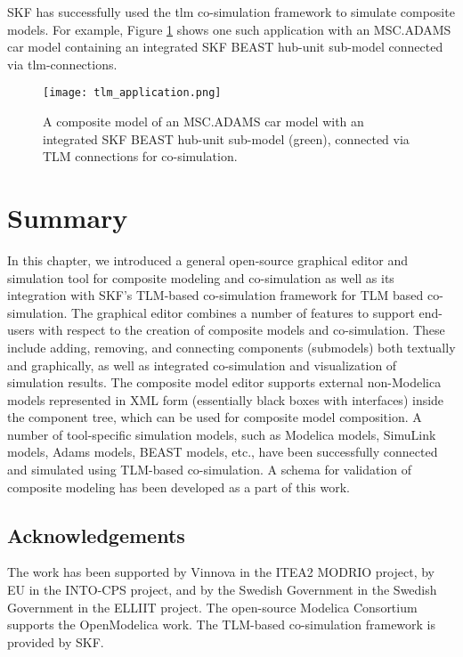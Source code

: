 SKF has successfully used the \acrshort{tlm} co-simulation framework to simulate composite models. For
example, Figure \ref{fig:tlmapplication} shows one such application with an MSC.ADAMS \cite{adams} car model
containing an integrated SKF BEAST\cite{beast} hub-unit sub-model 
connected via \acrshort{tlm}-connections.

\begin{figure}
	\texttt{[image: tlm\_application.png]}
	\caption{A composite model of an MSC.ADAMS car model with an integrated SKF BEAST hub-unit sub-model (green), connected 
		     via TLM connections for co-simulation.}
	\label{fig:tlmapplication}
\end{figure}

\section{Summary}
\label{sec:tlmsummary}

In this chapter, we introduced a general open-source graphical editor and simulation tool for composite modeling and co-simulation as well as its integration with SKF’s TLM-based co-simulation framework for TLM based co-simulation. The graphical editor combines a number of features to support end-users with respect to the creation of composite models and co-simulation. These include adding, removing, and connecting components (submodels) both textually and graphically, as well as integrated co-simulation and visualization of simulation results. The composite model editor supports external non-Modelica models represented in XML form (essentially black boxes with interfaces) inside the component tree, which can be used for composite model composition. A number of tool-specific simulation models, such as Modelica models, SimuLink models, Adams models, BEAST models,
etc., have been successfully connected and simulated using TLM-based co-simulation. A schema for validation of composite modeling has been developed as a part of this work. 

\subsection*{Acknowledgements}
\label{sec:tlmAcknowledgements}

The work has been supported by Vinnova in the ITEA2
MODRIO project, by EU in the INTO-CPS project, and by the Swedish Government in the Swedish
Government in the ELLIIT project. The open-source Modelica Consortium supports the OpenModelica
work. The TLM-based co-simulation framework is provided by SKF.





